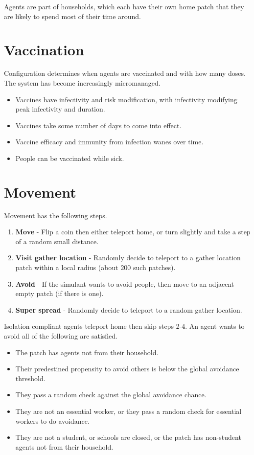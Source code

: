 \documentclass[]{article}
\begin{document}
Agents are part of households, which each have their own home patch that they are likely to spend most of their time around.

\section{Vaccination}
Configuration determines when agents are vaccinated and with how many doses. The system has become increasingly micromanaged. 
\begin{itemize}
	\item Vaccines have infectivity and risk modification, with infectivity modifying peak infectivity and duration.
	\item Vaccines take some number of days to come into effect.
	\item Vaccine efficacy and immunity from infection wanes over time.
	\item People can be vaccinated while sick.
\end{itemize}

\section{Movement}
Movement has the following steps.
\begin{enumerate}
	\item \textbf{Move} - Flip a coin then either teleport home, or turn slightly and take a step of a random small distance.
	\item \textbf{Visit gather location} - Randomly decide to teleport to a gather location patch within a local radius (about $200$ such patches).
	\item \textbf{Avoid} - If the simulant wants to avoid people, then move to an adjacent  empty patch (if there is one).
	\item \textbf{Super spread} - Randomly decide to teleport to a random gather location.
\end{enumerate}
Isolation compliant agents teleport home then skip steps 2-4. An agent wants to avoid all of the following are satisfied.
\begin{itemize}
	\item The patch has agents not from their household.
	\item Their predestined propensity to avoid others is below the global avoidance threshold.
	\item They pass a random check against the global avoidance chance.
	\item They are not an essential worker, or they pass a random check for essential workers to do avoidance.
	\item They are not a student, or schools are closed, or the patch has non-student agents not from their household.
\end{itemize}
\end{document}
